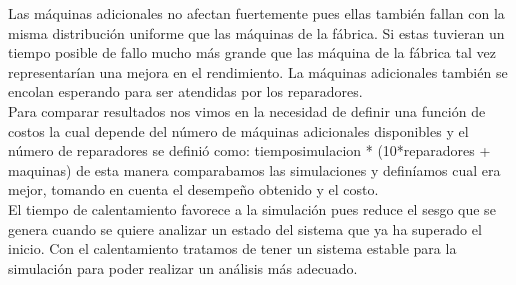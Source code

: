 \documentclass[12pt]{article}
\begin{document}
Las m\'aquinas adicionales no afectan fuertemente pues ellas también fallan con la misma distribución uniforme que las m\'aquinas de la f\'abrica. Si estas tuvieran un tiempo posible de fallo mucho más grande que las m\'aquina de la fábrica tal vez representarían una mejora en el rendimiento. La m\'aquinas adicionales tambi\'en se encolan esperando para ser atendidas por los reparadores.\\


Para comparar resultados nos vimos en la necesidad de definir una funci\'on de costos la cual depende del n\'umero de m\'aquinas adicionales disponibles y el n\'umero de reparadores se defini\'o como: tiemposimulacion * (10*reparadores + maquinas) de esta manera comparabamos las simulaciones y defin\'iamos cual era mejor, tomando en  cuenta el desempeño obtenido y el costo.\\


El tiempo de calentamiento favorece a la simulaci\'on pues reduce el sesgo que se genera cuando se quiere analizar un estado del sistema que ya ha superado el inicio. Con el calentamiento tratamos de tener un sistema estable para la simulaci\'on para poder realizar un an\'alisis m\'as adecuado.
\end{document}
